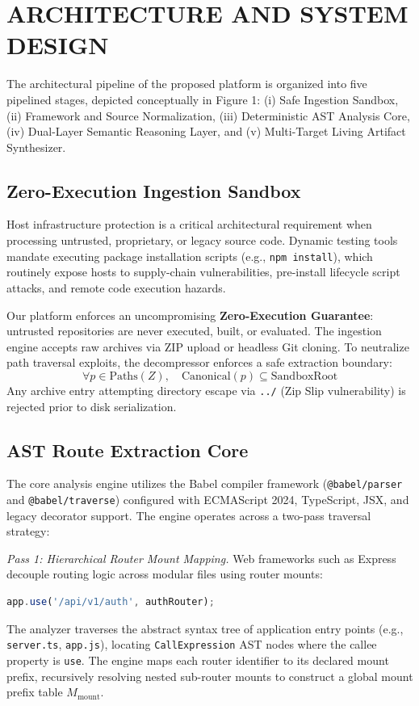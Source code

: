 \documentclass[a4paper,10pt]{article}
\begin{document}
\section{ARCHITECTURE AND SYSTEM DESIGN}
\noindent
The architectural pipeline of the proposed platform is organized into five pipelined stages, depicted conceptually in Figure 1: (i) Safe Ingestion Sandbox, (ii) Framework and Source Normalization, (iii) Deterministic AST Analysis Core, (iv) Dual-Layer Semantic Reasoning Layer, and (v) Multi-Target Living Artifact Synthesizer.

\subsection{Zero-Execution Ingestion Sandbox}
\noindent
Host infrastructure protection is a critical architectural requirement when processing untrusted, proprietary, or legacy source code. Dynamic testing tools mandate executing package installation scripts (e.g., \texttt{npm install}), which routinely expose hosts to supply-chain vulnerabilities, pre-install lifecycle script attacks, and remote code execution hazards.

Our platform enforces an uncompromising \textbf{Zero-Execution Guarantee}: untrusted repositories are never executed, built, or evaluated. The ingestion engine accepts raw archives via ZIP upload or headless Git cloning. To neutralize path traversal exploits, the decompressor enforces a safe extraction boundary:
\begin{equation}
\forall p \in \text{Paths}(Z), \quad \text{Canonical}(p) \subseteq \text{SandboxRoot}
\end{equation}
Any archive entry attempting directory escape via \texttt{../} (Zip Slip vulnerability) is rejected prior to disk serialization.

\subsection{AST Route Extraction Core}
\noindent
The core analysis engine utilizes the Babel compiler framework (\texttt{@babel/parser} and \texttt{@babel/traverse}) configured with ECMAScript 2024, TypeScript, JSX, and legacy decorator support. The engine operates across a two-pass traversal strategy:

\textit{Pass 1: Hierarchical Router Mount Mapping.} Web frameworks such as Express decouple routing logic across modular files using router mounts:
\begin{lstlisting}[language=JavaScript]
app.use('/api/v1/auth', authRouter);
\end{lstlisting}
The analyzer traverses the abstract syntax tree of application entry points (e.g., \texttt{server.ts}, \texttt{app.js}), locating \texttt{CallExpression} AST nodes where the callee property is \texttt{use}. The engine maps each router identifier to its declared mount prefix, recursively resolving nested sub-router mounts to construct a global mount prefix table $M_{\text{mount}}$.
\end{document}
